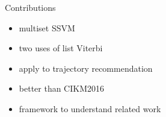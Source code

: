 Contributions
\begin{itemize}
  \item multiset SSVM
  \item two uses of list Viterbi
  \item apply to trajectory recommendation
  \item better than CIKM2016
  \item framework to understand related work
\end{itemize}

